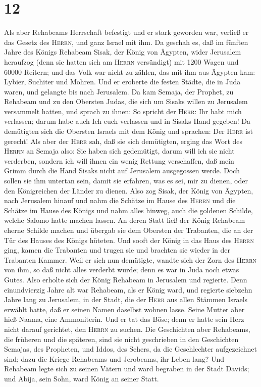 \hypertarget{section-11}{%
\section{12}\label{section-11}}

 Als aber Rehabeams Herrschaft befestigt und er stark
geworden war, verließ er das Gesetz des \textsc{Herrn}, und ganz Israel
mit ihm.  Da geschah es, daß im fünften Jahre des Königs
Rehabeam Sisak, der König von Ägypten, wider Jerusalem heraufzog (denn
sie hatten sich am \textsc{Herrn} versündigt)  mit 1200
Wagen und 60000 Reitern; und das Volk war nicht zu zählen, das mit ihm
aus Ägypten kam: Lybier, Suchiter und Mohren.  Und er
eroberte die festen Städte, die in Juda waren, und gelangte bis nach
Jerusalem.  Da kam Semaja, der Prophet, zu Rehabeam und zu
den Obersten Judas, die sich um Sisaks willen zu Jerusalem versammelt
hatten, und sprach zu ihnen: So spricht der \textsc{Herr}: Ihr habt mich
verlassen; darum habe auch Ich euch verlassen und in Sisaks Hand
gegeben!  Da demütigten sich die Obersten Israels mit dem
König und sprachen: Der \textsc{Herr} ist gerecht!  Als
aber der \textsc{Herr} sah, daß sie sich demütigten, erging das Wort des
\textsc{Herrn} an Semaja also: Sie haben sich gedemütigt, darum will ich
sie nicht verderben, sondern ich will ihnen ein wenig Rettung
verschaffen, daß mein Grimm durch die Hand Sisaks nicht auf Jerusalem
ausgegossen werde.  Doch sollen sie ihm untertan sein,
damit sie erfahren, was es sei, mir zu dienen, oder den Königreichen der
Länder zu dienen.  Also zog Sisak, der König von Ägypten,
nach Jerusalem hinauf und nahm die Schätze im Hause des \textsc{Herrn}
und die Schätze im Hause des Königs und nahm alles hinweg, auch die
goldenen Schilde, welche Salomo hatte machen lassen.  An
deren Statt ließ der König Rehabeam eherne Schilde machen und übergab
sie dem Obersten der Trabanten, die an der Tür des Hauses des Königs
hüteten.  Und sooft der König in das Haus des
\textsc{Herrn} ging, kamen die Trabanten und trugen sie und brachten sie
wieder in der Trabanten Kammer.  Weil er sich nun
demütigte, wandte sich der Zorn des \textsc{Herrn} von ihm, so daß nicht
alles verderbt wurde; denn es war in Juda noch etwas Gutes.
 Also erholte sich der König Rehabeam in Jerusalem und
regierte. Denn einundvierzig Jahre alt war Rehabeam, als er König ward,
und regierte siebzehn Jahre lang zu Jerusalem, in der Stadt, die der
\textsc{Herr} aus allen Stämmen Israels erwählt hatte, daß er seinen
Namen daselbst wohnen lasse. Seine Mutter aber hieß Naama, eine
Ammoniterin.  Und er tat das Böse; denn er hatte sein
Herz nicht darauf gerichtet, den \textsc{Herrn} zu suchen.
 Die Geschichten aber Rehabeams, die früheren und die
späteren, sind sie nicht geschrieben in den Geschichten Semajas, des
Propheten, und Iddos, des Sehers, da die Geschlechter aufgezeichnet
sind; dazu die Kriege Rehabeams und Jerobeams, ihr Leben lang?
 Und Rehabeam legte sich zu seinen Vätern und ward
begraben in der Stadt Davids; und Abija, sein Sohn, ward König an seiner
Statt.

